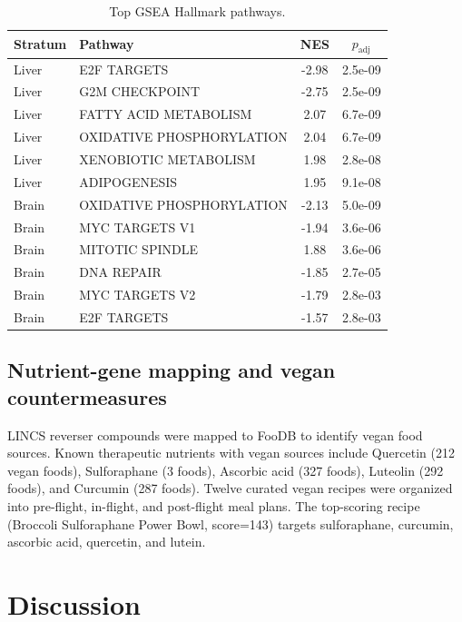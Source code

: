 \documentclass[11pt,a4paper]{article}
\begin{document}
\begin{table}[ht]
\centering
\caption{Top GSEA Hallmark pathways.}
\label{tab:gsea}
\small
\begin{tabular}{llcc}
\toprule
\textbf{Stratum} & \textbf{Pathway} & \textbf{NES} & \textbf{$p_{\text{adj}}$} \\
\midrule
Liver & E2F TARGETS & -2.98 & 2.5e-09 \\
Liver & G2M CHECKPOINT & -2.75 & 2.5e-09 \\
Liver & FATTY ACID METABOLISM & 2.07 & 6.7e-09 \\
Liver & OXIDATIVE PHOSPHORYLATION & 2.04 & 6.7e-09 \\
Liver & XENOBIOTIC METABOLISM & 1.98 & 2.8e-08 \\
Liver & ADIPOGENESIS & 1.95 & 9.1e-08 \\
\midrule
Brain & OXIDATIVE PHOSPHORYLATION & -2.13 & 5.0e-09 \\
Brain & MYC TARGETS V1 & -1.94 & 3.6e-06 \\
Brain & MITOTIC SPINDLE & 1.88 & 3.6e-06 \\
Brain & DNA REPAIR & -1.85 & 2.7e-05 \\
Brain & MYC TARGETS V2 & -1.79 & 2.8e-03 \\
Brain & E2F TARGETS & -1.57 & 2.8e-03 \\
\bottomrule
\end{tabular}
\end{table}

\subsection{Nutrient-gene mapping and vegan countermeasures}
LINCS reverser compounds were mapped to FooDB to identify vegan food sources. Known therapeutic 
nutrients with vegan sources include Quercetin (212 vegan foods), Sulforaphane (3 foods), Ascorbic 
acid (327 foods), Luteolin (292 foods), and Curcumin (287 foods). Twelve curated vegan recipes were 
organized into pre-flight, in-flight, and post-flight meal plans. The top-scoring recipe (Broccoli 
Sulforaphane Power Bowl, score=143) targets sulforaphane, curcumin, ascorbic acid, quercetin, and 
lutein.

\section{Discussion}
\end{document}
